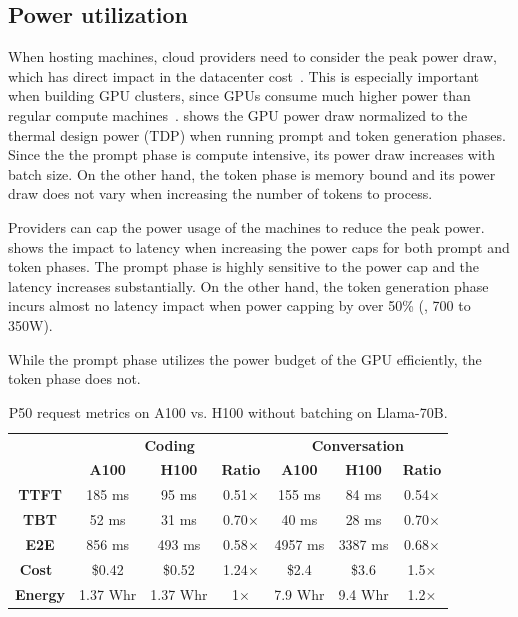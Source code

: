\subsection{Power utilization}
When hosting machines, cloud providers need to consider the peak power draw, which has direct impact in the datacenter cost~\cite{barroso2018_Datacenter}.
This is especially important when building GPU clusters, since GPUs consume much higher power than regular compute machines~\cite{patel2024llmpower,patel2023towards}.
 shows the GPU power draw normalized to the thermal design power (TDP) when running prompt and token generation phases.
Since the the prompt phase is compute intensive, its power draw increases with batch size.
On the other hand, the token phase is memory bound and its power draw does not vary when increasing the number of tokens to process.

Providers can cap the power usage of the machines to reduce the peak power.
 shows the impact to latency when increasing the power caps for both prompt and token phases.
The prompt phase is highly sensitive to the power cap and the latency increases substantially.
On the other hand, the token generation phase incurs almost no latency impact when power capping by over 50\% (\ie, 700 to 350W).

While the prompt phase utilizes the power budget of the GPU efficiently, the token phase does not.


\begin{table}[t]
\centering
\footnotesize
\begin{tabular}{@{}ccccccc@{}}
\toprule
                      &\multicolumn{3}{c}{\textbf{Coding}} & \multicolumn{3}{c}{\textbf{Conversation}}\\
                      & \textbf{A100}   &\textbf{H100}  &\textbf{Ratio}      &\textbf{A100}      &\textbf{H100} &\textbf{Ratio}\\\midrule                      
\textbf{TTFT}         & 185 ms   & 95 ms  & 0.51$\times$ & 155 ms  & 84 ms   & 0.54$\times$ \\
\textbf{TBT}          & 52 ms    & 31 ms  & 0.70$\times$ & 40 ms   & 28 ms   & 0.70$\times$ \\
\textbf{E2E}          & 856 ms   & 493 ms & 0.58$\times$ & 4957 ms & 3387 ms & 0.68$\times$ \\
\textbf{Cost~\cite{coreweave}} & \$0.42 & \$0.52 & 1.24$\times$ & \$2.4  & \$3.6 & 1.5$\times$ \\
\textbf{Energy}       & 1.37 Whr & 1.37 Whr & 1$\times$  & 7.9 Whr   & 9.4 Whr    & 1.2$\times$ \\
\bottomrule
\end{tabular}
\caption{P50 request metrics on A100 vs. H100 without batching on Llama-70B.}
\label{tab:a100h100results}
\end{table}


